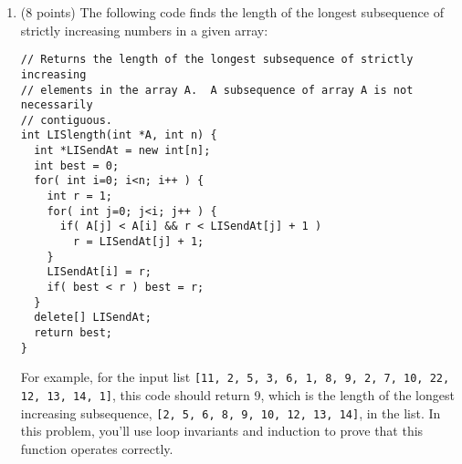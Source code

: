 \documentclass[11pt,table]{article}
\begin{document}
\begin{enumerate}
\begin{enumerate}
\begin{enumerate}
{{\begin{minipage}{\linewidth}
\begin{proof}
\mbox{}\par
\vspace{3in}
\end{proof}
\end{minipage}
}}

\item (5 points)
Let $T(n)$ be the run time of this algorithm.
Express $T(n)$ as a recurrence relation.
Use repeated substitution (ignore floors/ceilings when calculating $n/2$)
to determine a closed-form solution for $T(n)$, i.e., express $T(n)$
as a non-recursive function of $n$ with no summations.

{ \setlength{\fboxrule}{2pt}
}

\end{enumerate}

\item (8 points)
The following code finds the length of the longest subsequence of strictly increasing numbers in a given array:
\begin{verbatim}
// Returns the length of the longest subsequence of strictly increasing
// elements in the array A.  A subsequence of array A is not necessarily
// contiguous.
int LISlength(int *A, int n) {
  int *LISendAt = new int[n];
  int best = 0;
  for( int i=0; i<n; i++ ) {
    int r = 1;
    for( int j=0; j<i; j++ ) {
      if( A[j] < A[i] && r < LISendAt[j] + 1 )
        r = LISendAt[j] + 1;
    }
    LISendAt[i] = r;
    if( best < r ) best = r;
  }
  delete[] LISendAt;
  return best;
}
\end{verbatim}
For example, for the input list
\texttt{[11, 2, 5, 3, 6, 1, 8, 9, 2, 7, 10, 22, 12, 13, 14, 1]},
this code should return 9, which is the length of the longest
increasing subsequence,
\texttt{[2, 5, 6, 8, 9, 10, 12, 13, 14]},
in the list.
In this problem, you'll use loop invariants and induction to prove
that this function operates correctly.


\end{enumerate}
\end{enumerate}
\end{document}
